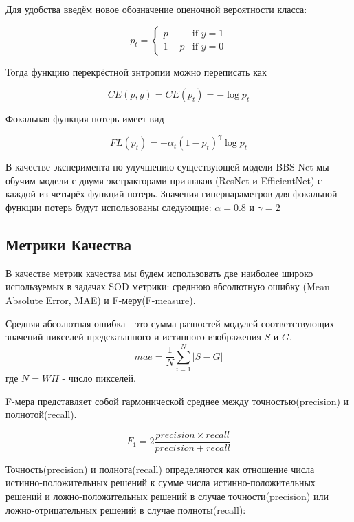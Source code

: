 Для удобства введём новое обозначение оценочной вероятности класса:

\begin{equation}
    p_t=\begin{cases}
        p & \text{if }y=1\\
        1-p & \text{if }y=0
     \end{cases}
\end{equation}

Тогда функцию перекрёстной энтропии можно переписать как

\begin{equation}
    CE(p,y) = CE(p_t) = -\log{p_t}
\end{equation}

Фокальная функция потерь имеет вид

\begin{equation}
    FL(p_t) = -\alpha_t(1-p_t)^{\gamma}\log{p_t}
\end{equation}
 
В качестве эксперимента по улучшению существующей модели BBS-Net\cite{BBS} мы обучим модели с двумя экстракторами признаков 
(ResNet и EfficientNet) с каждой из четырёх функций потерь.
Значения гиперпараметров для фокальной функции потерь будут использованы следующие: $\alpha=0.8$ и $\gamma=2$


\subsection{Метрики Качества}

В качестве метрик качества мы будем использовать две наиболее широко используемых в задачах SOD метрики: 
среднюю абсолютную ошибку (Mean Absolute Error, MAE) и F-меру(F-measure).

Средняя абсолютная ошибка - это сумма разностей
модулей соответствующих значений пикселей предсказанного
 и истинного изображения $S$ и $G$.
\begin{equation}
    mae = \frac{1}{N}\sum_{i=1}^N|S - G|
\end{equation}
где $N = WH$ - число пикселей.


F-мера представляет собой гармонической среднее 
между точностью(precision) и полнотой(recall).

\begin{equation}
    F_1 = 2\frac{precision \times recall}{precision + recall}
\end{equation}

Точность(precision) и полнота(recall) определяются 
как отношение числа истинно-положительных решений к сумме 
числа истинно-положительных решений и ложно-положительных решений в случае 
точности(precision) или ложно-отрицательных решений в случае 
полноты(recall):

